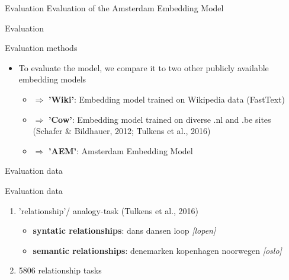 \begin{frame}{Evaluation}
  Evaluation of the Amsterdam Embedding Model
\end{frame}

\begin{frame}{Evaluation}
  \begin{block}{Evaluation methods}
    \begin{itemize}
    \item To evaluate the model, we compare it to two other publicly available embedding models
      \begin{itemize}
      \item $\Rightarrow$ \textbf {'Wiki'}: Embedding model trained on Wikipedia data (FastText)
      \item $\Rightarrow$ \textbf{'Cow'}: Embedding model trained on diverse .nl and .be sites (Schafer \& Bildhauer, 2012; Tulkens et al., 2016)
      \item $\Rightarrow$ \textbf{'AEM'}: Amsterdam Embedding Model
      \end{itemize}
    \end{itemize}
  \end{block}
\end{frame}


\begin{frame}{Evaluation data}
  \begin{block}{Evaluation data}
    \begin{enumerate}
    \item 'relationship'/ analogy-task (Tulkens et al., 2016)
      \begin{itemize}
      \item \textbf{syntatic relationships}: dans dansen loop \textit{[lopen]}
      \item \textbf{semantic relationships}: denemarken kopenhagen noorwegen \textit{[oslo]}
      \end{itemize}
    \item 5806 relationship tasks
    \end{enumerate}
  \end{block}
\end{frame}


